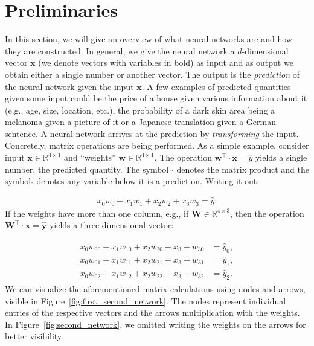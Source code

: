 \section{Preliminaries}

In this section, we will give an overview of what neural networks are and how they are constructed. In general, we give the neural network a $d$-dimensional vector $\bm{x}$ (we denote vectors with variables in bold) as input and as output we obtain either a single number or another vector. The output is the \textit{prediction} of the neural network given the input $\bm{x}$. A few examples of predicted quantities given some input could be the price of a house given various information about it (e.g., age, size, location, etc.), the probability of a dark skin area being a melanoma given a picture of it or a Japanese translation given a German sentence. A neural network arrives at the prediction by \textit{transforming} the input. Concretely, matrix operations are being performed. As a simple example, consider input $\bm{x} \in \mathds{R}^{4 \times 1}$ and \enquote{weights} $\bm{w} \in \mathds{R}^{4 \times 1}$. The operation $\bm{w}^\top \cdot \bm{x} = \hat{y}$ yields a single number, the predicted quantity. The symbol $\cdot$ denotes the matrix product and the symbol $\hat{}$ denotes any variable below it is a prediction. Writing it out:

\begin{align} \label{eq:first_network}
    x_0 w_0 + x_1 w_1 + x_2 w_2 + x_3 w _3 = \hat{y}.
\end{align} If the weights have more than one column, e.g., if $\bm{W} \in \mathds{R}^{4 \times 3}$, then the operation $\bm{W}^\top \cdot \bm{x} = \hat{\bm{y}}$ yields a three-dimensional vector:

\begin{align} \label{eq:second_network}
    \begin{split}
        x_0 w_{00} + x_1 w_{10} + x_2 w_{20} + x_3 + w_{30} & = \hat{y}_0, \\
        x_0 w_{01} + x_1 w_{11} + x_2 w_{21} + x_3 + w_{31} & = \hat{y}_1, \\
        x_0 w_{02} + x_1 w_{12} + x_2 w_{22} + x_3 + w_{32} & = \hat{y}_2.
    \end{split}
\end{align}We can visualize the aforementioned matrix calculations using nodes and arrows, visible in Figure~\ref{fig:first_second_network}. The nodes represent individual entries of the respective vectors and the arrows multiplication with the weights. In Figure~\ref{fig:second_network}, we omitted writing the weights on the arrows for better visibility.


